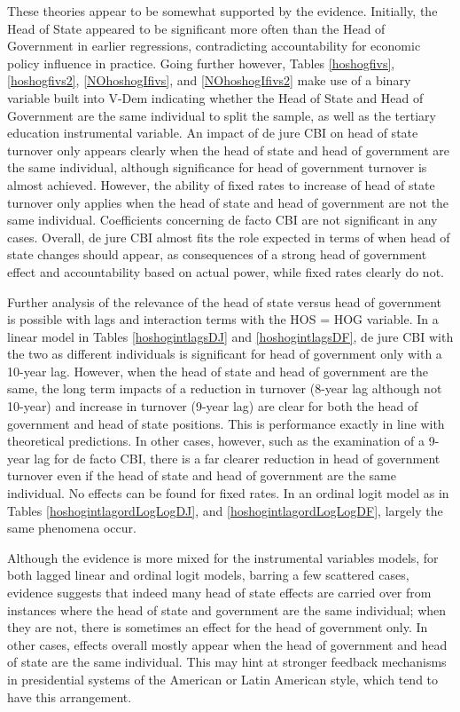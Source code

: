 \documentclass{article}
\begin{document}
    These theories appear to be somewhat supported by the evidence. Initially, the Head of State appeared to be significant more often than the Head of Government in earlier regressions, contradicting accountability for economic policy influence in practice. Going further however, Tables \ref{hoshogfivs}, \ref{hoshogfivs2}, \ref{NOhoshogIfivs}, and \ref{NOhoshogIfivs2} make use of a binary variable built into V-Dem indicating whether the Head of State and Head of Government are the same individual to split the sample, as well as the tertiary education instrumental variable.  An impact of de jure CBI on head of state turnover only appears clearly when the head of state and head of government are the same individual, although significance for head of government turnover is almost achieved. However, the ability of fixed rates to increase of head of state turnover only applies when the head of state and head of government are not the same individual. Coefficients concerning de facto CBI are not significant in any cases. Overall, de jure CBI almost fits the role expected in terms of when head of state changes should appear, as consequences of a strong head of government effect and accountability based on actual power, while fixed rates clearly do not. 

    Further analysis of the relevance of the head of state versus head of government is possible with lags and interaction terms with the HOS = HOG variable. In a linear model in Tables \ref{hoshogintlagsDJ} and \ref{hoshogintlagsDF}, de jure CBI with the two as different individuals is significant for head of government only with a 10-year lag. However, when the head of state and head of government are the same, the long term impacts of a reduction in turnover (8-year lag although not 10-year) and increase in turnover (9-year lag) are clear for both the head of government and head of state positions. This is performance exactly in line with theoretical predictions. In other cases, however, such as the examination of a 9-year lag for de facto CBI, there is a far clearer reduction in head of government turnover even if the head of state and head of government are the same individual. No effects can be found for fixed rates. In an ordinal logit model as in Tables \ref{hoshogintlagordLogLogDJ}, and \ref{hoshogintlagordLogLogDF}, largely the same phenomena occur. 

    Although the evidence is more mixed for the instrumental variables models, for both lagged linear and ordinal logit models, barring a few scattered cases, evidence suggests that indeed many head of state effects are carried over from instances where the head of state and government are the same individual; when they are not, there is sometimes an effect for the head of government only. In other cases, effects overall mostly appear when the head of government and head of state are the same individual. This may hint at stronger feedback mechanisms in presidential systems of the American or Latin American style, which tend to have this arrangement.
\end{document}
